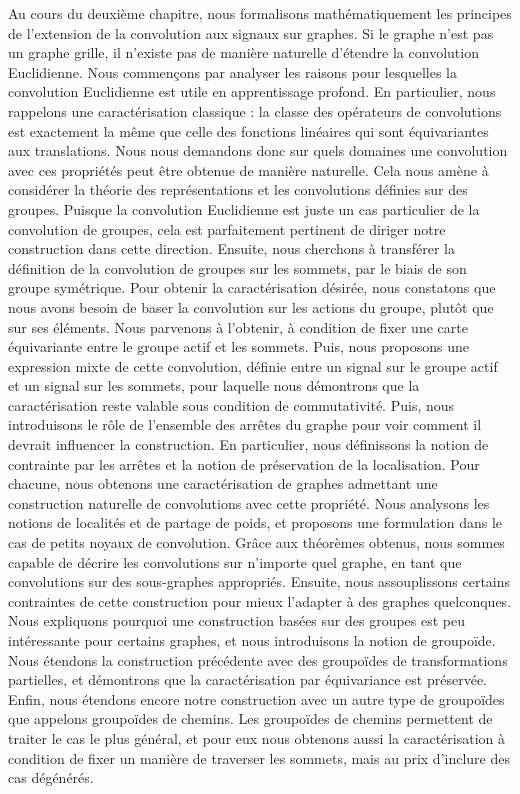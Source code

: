 Au cours du deuxième chapitre, nous formalisons mathématiquement les principes de l'extension de la convolution aux signaux sur graphes. Si le graphe n'est pas un graphe grille, il n'existe pas de manière naturelle d'étendre la convolution Euclidienne. Nous commençons par analyser les raisons pour lesquelles la convolution Euclidienne est utile en apprentissage profond. En particulier, nous rappelons une caractérisation classique : la classe des opérateurs de convolutions est exactement la même que celle des fonctions linéaires qui sont équivariantes aux translations. Nous nous demandons donc sur quels domaines une convolution avec ces propriétés peut être obtenue de manière naturelle. Cela nous amène à considérer la théorie des représentations et les convolutions définies sur des groupes. Puisque la convolution Euclidienne est juste un cas particulier de la convolution de groupes, cela est parfaitement pertinent de diriger notre construction dans cette direction. Ensuite, nous cherchons à transférer la définition de la convolution de groupes sur les sommets, par le biais de son groupe symétrique. Pour obtenir la caractérisation désirée, nous constatons que nous avons besoin de baser la convolution sur les actions du groupe, plutôt que sur ses éléments. Nous parvenons à l'obtenir, à condition de fixer une carte équivariante entre le groupe actif et les sommets. Puis, nous proposons une expression mixte de cette convolution, définie entre un signal sur le groupe actif et un signal sur les sommets, pour laquelle nous démontrons que la caractérisation reste valable sous condition de commutativité. Puis, nous introduisons le rôle de l'ensemble des arrêtes du graphe pour voir comment il devrait influencer la construction. En particulier, nous définissons la notion de contrainte par les arrêtes et la notion de préservation de la localisation. Pour chacune, nous obtenons une caractérisation de graphes admettant une construction naturelle de convolutions avec cette propriété. Nous analysons les notions de localités et de partage de poids, et proposons une formulation dans le cas de petits noyaux de convolution. Grâce aux théorèmes obtenus, nous sommes capable de décrire les convolutions sur n'importe quel graphe, en tant que convolutions sur des sous-graphes appropriés. Ensuite, nous assouplissons certains contraintes de cette construction pour mieux l'adapter à des graphes quelconques. Nous expliquons pourquoi une construction basées sur des groupes est peu intéressante pour certains graphes, et nous introduisons la notion de groupoïde. Nous étendons la construction précédente avec des groupoïdes de transformations partielles, et démontrons que la caractérisation par équivariance est préservée. Enfin, nous étendons encore notre construction avec un autre type de groupoïdes que appelons groupoïdes de chemins. Les groupoïdes de chemins permettent de traiter le cas le plus général, et pour eux nous obtenons aussi la caractérisation à condition de fixer un manière de traverser les sommets, mais au prix d'inclure des cas dégénérés.

